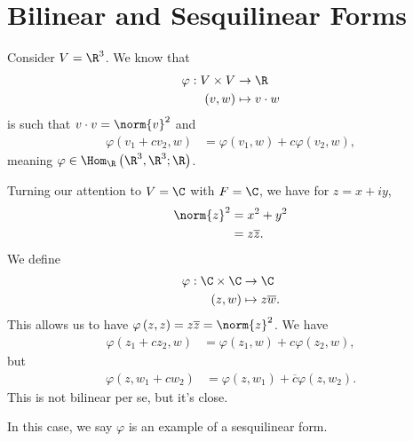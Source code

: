 \documentclass[10pt]{mypackage}
\begin{document}
  \section{Bilinear and Sesquilinear Forms}%
  Consider $V = \R^3$. We know that
  \begin{align*}
    \varphi: V\times V &\rightarrow \R\\
    \left(v,w\right) &\mapsto v\cdot w
  \end{align*}
  is such that $v\cdot v = \norm{v}^2$ and
  \begin{align*}
    \varphi\left(v_1 + cv_2,w\right) &= \varphi\left(v_1,w\right) + c\varphi\left(v_2,w\right),
  \end{align*}
  meaning $\varphi\in \Hom_{\R}\left(\R^3,\R^3;\R\right)$.\newline

  Turning our attention to $V = \C$ with $F = \C$, we have for $z = x + iy$,
  \begin{align*}
    \norm{z}^2 &= x^2 + y^2\\
               &= z \overline{z}.
  \end{align*}
  We define
  \begin{align*}
    \varphi: \C \times \C &\rightarrow \C\\
    \left(z,w\right) &\mapsto z\overline{w}.
  \end{align*}
  This allows us to have $\varphi\left(z,z\right) = z\overline{z} = \norm{z}^2$. We have
  \begin{align*}
    \varphi\left(z_1 + cz_2,w\right) &= \varphi\left(z_1,w\right) + c\varphi\left(z_2,w\right),
  \end{align*}
  but
  \begin{align*}
    \varphi\left(z,w_1 + cw_2\right) &= \varphi\left(z,w_1\right) + \overline{c}\varphi\left(z,w_2\right).
  \end{align*}
  This is not bilinear per se, but it's close.\newline

  In this case, we say $\varphi$ is an example of a sesquilinear form.
\end{document}
